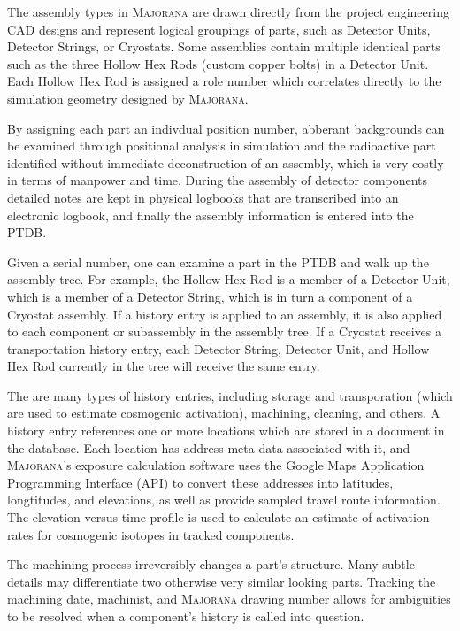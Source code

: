 \documentclass[journal]{IEEEtran}
\begin{document}
The assembly types in \textsc{Majorana} are drawn directly from the project engineering CAD designs and represent logical 
groupings of parts, such as Detector Units, Detector Strings, or Cryostats. 
Some assemblies contain multiple identical parts such as the three Hollow Hex Rods (custom copper bolts) in a Detector Unit.
Each Hollow Hex Rod is assigned a role number which correlates directly to the simulation geometry designed by \textsc{Majorana}. 

By assigning each part an indivdual position number, abberant backgrounds can be examined through positional analysis in 
simulation and the radioactive part identified without immediate deconstruction of an assembly, which is very costly in 
terms of manpower and time. During the assembly of detector components detailed notes are kept in physical logbooks that are
transcribed into an electronic logbook, and finally the assembly information is entered into the PTDB.

Given a serial number, one can examine a part in the PTDB and walk up the assembly tree. For example, the Hollow Hex Rod is a member
of a Detector Unit, which is a member of a Detector String, which is in turn a component of a Cryostat assembly.
If a history entry is applied to an assembly, it is also applied to each component or sub\-assembly in the assembly tree. If a Cryostat receives
a transportation history entry, each Detector String, Detector Unit, and Hollow Hex Rod currently in the tree will receive the same entry.

The are many types of history entries, including storage and transporation (which are used to estimate cosmogenic activation), machining, cleaning,
and others. A history entry references one or more locations which are stored in a document in the database. Each location has address meta-data
associated with it, and \textsc{Majorana}'s exposure calculation software uses the 
Google Maps Application Programming Interface (API) \cite{google_maps_dev_guide} to convert these addresses into latitudes, longtitudes, and elevations,
as well as provide sampled travel route information. The elevation versus time
profile is used to calculate an estimate of activation rates for cosmogenic isotopes in tracked components.

The machining process irreversibly changes a part's structure. Many subtle details may differentiate
two otherwise very similar looking parts. Tracking the machining date, machinist, and \textsc{Majorana} drawing number allows
for ambiguities to be resolved when a component's history is called into question. 
\end{document}
